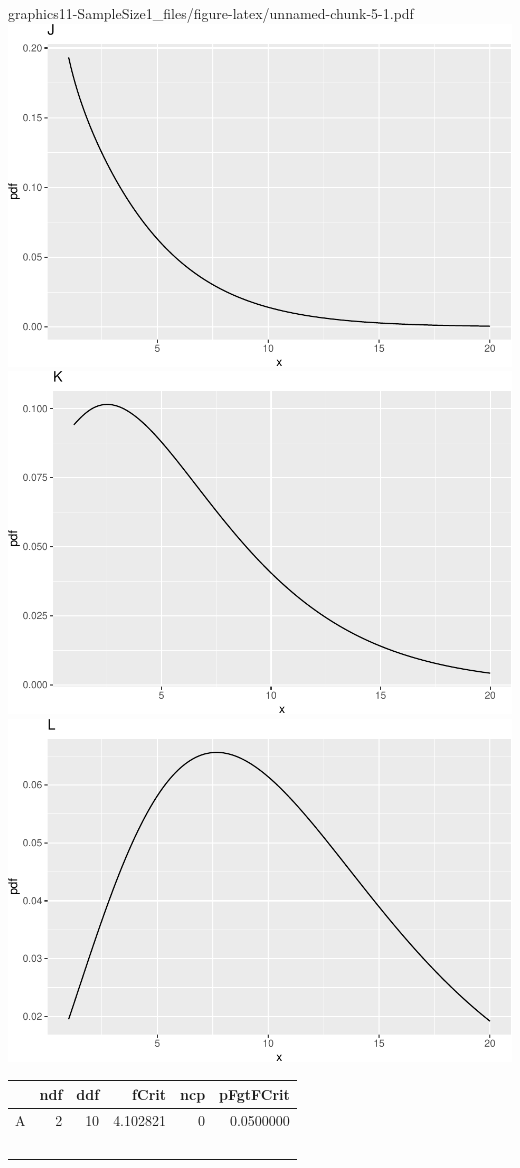 \documentclass[
]{book}
\begin{document}
graphics{11-SampleSize1_files/figure-latex/unnamed-chunk-5-1.pdf} \includegraphics{11-SampleSize1_files/figure-latex/unnamed-chunk-5-2.pdf} \includegraphics{11-SampleSize1_files/figure-latex/unnamed-chunk-5-3.pdf} \includegraphics{11-SampleSize1_files/figure-latex/unnamed-chunk-5-4.pdf}

\begin{tabular}{l|r|r|r|r|r}
\hline
  & ndf & ddf & fCrit & ncp & pFgtFCrit\\
\hline
A & 2 & 10 & 4.102821 & 0 & 0.0500000\\
\
\end{tabular}
\end{document}
